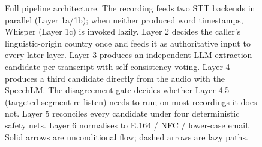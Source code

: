 \begin{figure}[!t]
{\begin{tikzpicture}
\end{tikzpicture}%
}%
\caption{Full pipeline architecture. The recording feeds two STT
backends in parallel (Layer 1a/1b); when neither produced word
timestamps, Whisper (Layer 1c) is invoked lazily. Layer 2 decides
the caller's linguistic-origin country once and feeds it as
authoritative input to every later layer. Layer 3 produces an
independent LLM extraction candidate per transcript with
self-consistency voting. Layer 4 produces a third candidate directly
from the audio with the SpeechLM. The disagreement gate decides
whether Layer 4.5 (targeted-segment re-listen) needs to run; on most
recordings it does not. Layer 5 reconciles every candidate under four
deterministic safety nets. Layer 6 normalises to E.164 / NFC /
lower-case email. Solid arrows are unconditional flow; dashed arrows
are lazy paths.}
\label{fig:pipeline}
\end{figure}
